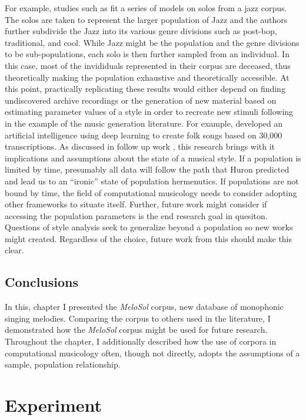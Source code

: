 \documentclass[12pt,]{book}
\begin{document}
For example, studies such as \citet{frielerTellingStoryDramaturgy2016} fit a series of models on solos from a jazz corpus.
The solos are taken to represent the larger population of Jazz and the authors further subdivide the Jazz into its various genre divisions such as post-bop, traditional, and cool.
While Jazz might be the population and the genre divisions to be sub-populations, each solo is then further sampled from an individual.
In this case, most of the invididuals represented in their corpus are deceased, thus theoretically making the population exhaustive and theoretically accessible.
At this point, practically replicating these results would either depend on finding undiscovered archive recordings or the generation of new material based on estimating parameter values of a style in order to recreate new stimuli following in the example of the music generation literature.
For example, \citet{sturmTakingModelsBack2017} developed an artificial intelligence using deep learning to create folk songs based on 30,000 transcriptions.
As discussed in follow up work \citep{sturmMachineLearningResearch2019}, this research brings with it implications and assumptions about the state of a musical style.
If a population is limited by time, presumably all data will follow the path that Huron predicted and lead us to an ``ironic'' state of population hermenutics.
If populations are not bound by time, the field of computational musicology needs to consider adopting other frameworks to situate itself.
Further, future work might consider if accessing the population parameters is the end research goal in quesiton.
Questions of style analysis seek to generalize beyond a population so new works might created.
Regardless of the choice, future work from this should make this clear.

\hypertarget{conclusions-2}{%
\section{Conclusions}\label{conclusions-2}}

In this, chapter I presented the \emph{MeloSol} corpus, new database of monophonic singing melodies.
Comparing the corpus to others used in the literature, I demonstrated how the \emph{MeloSol} corpus might be used for future research.
Throughout the chapter, I additionally described how the use of corpora in computational musicology often, though not directly, adopts the assumptions of a sample, population relationship.

\hypertarget{experiment}{%
\chapter{Experiment}\label{experiment}}
\end{document}
